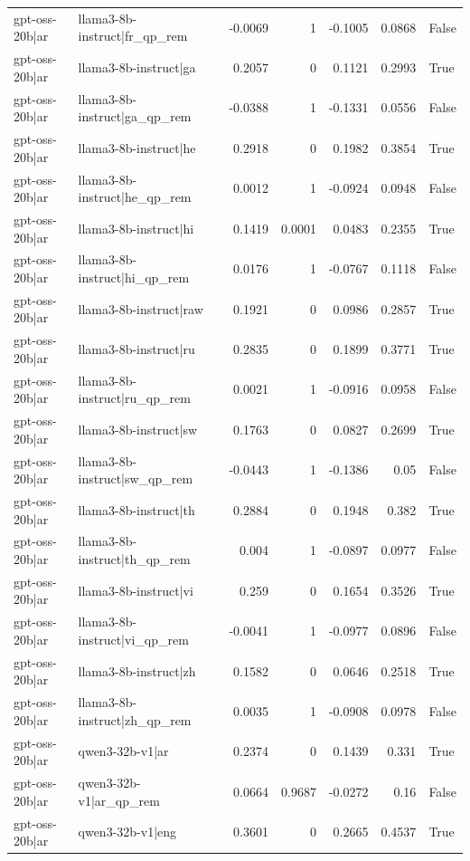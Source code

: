 \begin{table}
\begin{tabular}{l l r r r r l}
gpt-oss-20b|ar & llama3-8b-instruct|fr_qp_rem & -0.0069 & 1 & -0.1005 & 0.0868 & False \\
gpt-oss-20b|ar & llama3-8b-instruct|ga & 0.2057 & 0 & 0.1121 & 0.2993 & True \\
gpt-oss-20b|ar & llama3-8b-instruct|ga_qp_rem & -0.0388 & 1 & -0.1331 & 0.0556 & False \\
gpt-oss-20b|ar & llama3-8b-instruct|he & 0.2918 & 0 & 0.1982 & 0.3854 & True \\
gpt-oss-20b|ar & llama3-8b-instruct|he_qp_rem & 0.0012 & 1 & -0.0924 & 0.0948 & False \\
gpt-oss-20b|ar & llama3-8b-instruct|hi & 0.1419 & 0.0001 & 0.0483 & 0.2355 & True \\
gpt-oss-20b|ar & llama3-8b-instruct|hi_qp_rem & 0.0176 & 1 & -0.0767 & 0.1118 & False \\
gpt-oss-20b|ar & llama3-8b-instruct|raw & 0.1921 & 0 & 0.0986 & 0.2857 & True \\
gpt-oss-20b|ar & llama3-8b-instruct|ru & 0.2835 & 0 & 0.1899 & 0.3771 & True \\
gpt-oss-20b|ar & llama3-8b-instruct|ru_qp_rem & 0.0021 & 1 & -0.0916 & 0.0958 & False \\
gpt-oss-20b|ar & llama3-8b-instruct|sw & 0.1763 & 0 & 0.0827 & 0.2699 & True \\
gpt-oss-20b|ar & llama3-8b-instruct|sw_qp_rem & -0.0443 & 1 & -0.1386 & 0.05 & False \\
gpt-oss-20b|ar & llama3-8b-instruct|th & 0.2884 & 0 & 0.1948 & 0.382 & True \\
gpt-oss-20b|ar & llama3-8b-instruct|th_qp_rem & 0.004 & 1 & -0.0897 & 0.0977 & False \\
gpt-oss-20b|ar & llama3-8b-instruct|vi & 0.259 & 0 & 0.1654 & 0.3526 & True \\
gpt-oss-20b|ar & llama3-8b-instruct|vi_qp_rem & -0.0041 & 1 & -0.0977 & 0.0896 & False \\
gpt-oss-20b|ar & llama3-8b-instruct|zh & 0.1582 & 0 & 0.0646 & 0.2518 & True \\
gpt-oss-20b|ar & llama3-8b-instruct|zh_qp_rem & 0.0035 & 1 & -0.0908 & 0.0978 & False \\
gpt-oss-20b|ar & qwen3-32b-v1|ar & 0.2374 & 0 & 0.1439 & 0.331 & True \\
gpt-oss-20b|ar & qwen3-32b-v1|ar_qp_rem & 0.0664 & 0.9687 & -0.0272 & 0.16 & False \\
gpt-oss-20b|ar & qwen3-32b-v1|eng & 0.3601 & 0 & 0.2665 & 0.4537 & True \\

\end{tabular}
\end{table}

